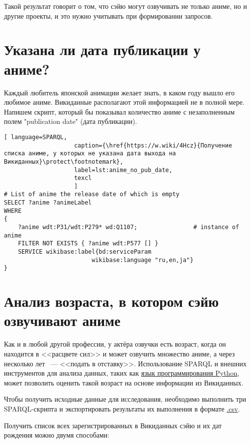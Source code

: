 Такой результат говорит о том, что сэйю могут озвучивать не только аниме, но и другие проекты, и это нужно учитывать при формировании запросов. 

\section{Указана ли дата публикации у аниме?}

Каждый любитель японской анимации желает знать, в каком году вышло его любимое аниме. Викиданные располагают этой информацией не в полной мере. Напишем скрипт, который бы показывал количество аниме с незаполненным полем "publication date" (дата публикации). 

\begin{lstlisting}[ language=SPARQL, 
                    caption={\href{https://w.wiki/4Hcz}{Получение списка аниме, у которых не указана дата выхода на Викиданных}\protect\footnotemark},
                    label=lst:anime_no_pub_date,
                    texcl 
                    ]
# List of anime the release date of which is empty
SELECT ?anime ?animeLabel
WHERE
{
    ?anime wdt:P31/wdt:P279* wd:Q1107;                # instance of anime
    FILTER NOT EXISTS { ?anime wdt:P577 [] }
    SERVICE wikibase:label{bd:serviceParam
					     wikibase:language "ru,en,ja"}
}
\end{lstlisting}%

\section{Анализ возраста, в котором сэйю озвучивают аниме}

Как и в любой другой профессии, у актёра озвучки есть возраст, когда он находится в <<расцвете сил>> и может озвучить множество аниме, а через несколько лет ~--- <<подать в отставку>>. Использование SPARQL и внешних инструментов для анализа данных, таких как \href{https://ru.wikipedia.org/wiki/Python}{язык программирования Python}, может позволить оценить такой возраст на основе информации из Викиданных.

Чтобы получить исходные данные для исследования, необходимо выполнить три SPARQL-скрипта и экспортировать результаты их выполнения в формате \href{https://ru.wikipedia.org/wiki/CSV}{.csv}.

Получить список всех зарегистрированных в Викиданных сэйю и их дат рождения можно двумя способами: 

